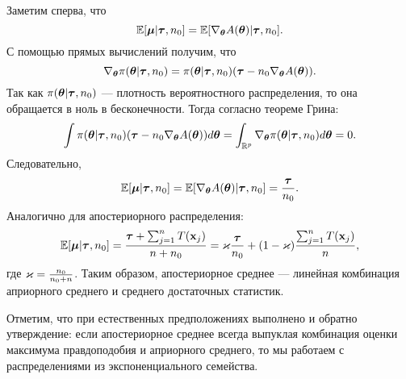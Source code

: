 Заметим сперва, что 
\[
\mathbb{E} [\boldsymbol{\mu} | \boldsymbol{\tau}, n_0] = \mathbb{E} [\nabla_{\boldsymbol{\theta}} A(\boldsymbol{\theta}) | \boldsymbol{\tau}, n_0].
\]
С помощью прямых вычислений получим, что
\[
\nabla_{\boldsymbol{\theta}} \pi(\boldsymbol{\theta}| \boldsymbol{\tau}, n_0) = \pi(\boldsymbol{\theta}| \boldsymbol{\tau}, n_0) (\boldsymbol{\tau} - n_0 \nabla_{\boldsymbol{\theta}} A(\boldsymbol{\theta})).
\]
Так как $\pi(\boldsymbol{\theta}| \boldsymbol{\tau}, n_0)$ --- плотность вероятностного распределения, то она обращается в ноль в бесконечности.
Тогда согласно теореме Грина:
\[
\int \pi(\boldsymbol{\theta}| \boldsymbol{\tau}, n_0) (\boldsymbol{\tau} - n_0 \nabla_{\boldsymbol{\theta}} A(\boldsymbol{\theta})) d\boldsymbol{\theta} =
\int_{\mathbb{R}^p} \nabla_{\boldsymbol{\theta}} \pi(\boldsymbol{\theta}| \boldsymbol{\tau}, n_0) d\boldsymbol{\theta} = 0.
\]
Следовательно, 
\[
\mathbb{E} [\boldsymbol{\mu} | \boldsymbol{\tau}, n_0] = \mathbb{E} [\nabla_{\boldsymbol{\theta}} A(\boldsymbol{\theta}) | \boldsymbol{\tau}, n_0] = \frac{\boldsymbol{\tau}}{n_0}.
\]
Аналогично для апостериорного распределения:
\[
\mathbb{E} [\boldsymbol{\mu} | \boldsymbol{\tau}, n_0] = \frac{\boldsymbol{\tau} + \sum_{j = 1}^n T(\mathbf{x}_j)}{n + n_0} = \varkappa \frac{\boldsymbol{\tau}}{n_0} + (1 - \varkappa) \frac{\sum_{j = 1}^n T(\mathbf{x}_j)}{n},
\]
где $\varkappa = \frac{n_0}{n_0 + n}$.
Таким образом, апостериорное среднее --- линейная комбинация априорного среднего и среднего достаточных статистик.

Отметим, что при естественных предположениях выполнено и обратно утверждение:
если апостериорное среднее всегда выпуклая комбинация оценки максимума правдоподобия и априорного среднего,
то мы работаем с распределениями из экспоненциального семейства.







